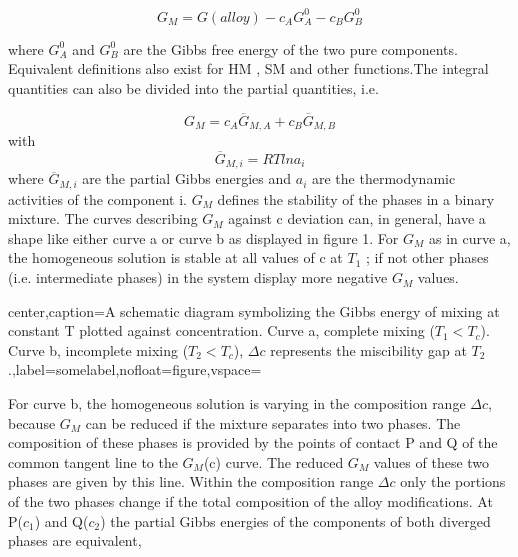 \documentclass[12pt]{article}
\newcommand*{\1}{\hspace{1pt}}
\begin{document}
    \begin{equation}
        G_M = G(alloy) - c_A G^{0}_{A} - c_B G^{0}_{B}
    \end{equation}

where $G ^{0}_{A}$ and $G ^{0}_{B}$ are the Gibbs free energy of the two pure components. Equivalent
definitions also exist for HM , SM and other functions.The integral quantities can also be divided 
into the partial quantities, i.e.

    \begin{equation}
        G_M = c_A \overline{G} _{M,A} + c_B \overline{G} _{M,B}
    \end{equation}
with
    \begin{equation}
        \overline{G} _{M,i} = RT ln a_i                \tag*{( i= A,B )}
    \end{equation}
where  $\overline{G} _{M,i} $ are the partial Gibbs energies and $a _{i}$ are the thermodynamic 
activities of the component i.
$G _M$ defines the stability of the phases in a binary mixture. The curves describing
$G _M$ against c deviation can, in general, have a shape like either curve a or curve b as displayed
in figure 1. For $G _M$ as in curve a, the homogeneous solution is stable at all values of c at
$T _1$ ; if not other phases (i.e. intermediate phases) in the system display more negative $G _M$
values.


    
\begin{adjustbox}{center,caption={A schematic diagram symbolizing the Gibbs energy of mixing at constant T plotted against concentration. 
    Curve a, complete mixing ($ T _1 < T _c $). 
    Curve b, incomplete mixing ($ T _2 < T _c $), 
    $\Delta c$ represents the miscibility gap at $ T _2$ .},label={somelabel},nofloat=figure,vspace=\bigskipamount}
\end{adjustbox}
    

    For curve b, the homogeneous solution is varying in the composition range $\Delta c$, because
$G _M$ can be reduced if the mixture separates into two phases. The composition of these phases
is provided by the points of contact P and Q of the common tangent line to the $G _M$(c) curve.
The reduced $G _M$  values of these two phases are given by this line. Within the composition
range $\Delta c$ only the portions of the two phases change if the total composition of the alloy
modifications. At P($c _1$) and Q($c _2$) the partial Gibbs energies of the components of both diverged
phases are equivalent,
\end{document}
